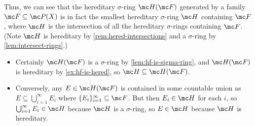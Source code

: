 \documentclass[../notes.tex]{subfiles}
\begin{document}
\begin{remark}
	Thus, we can see that the hereditary $\sigma$-ring $\mc H(\mc F)$ generated by a family $\mc F\subseteq\mc P(X)$ is in fact the smallest hereditary $\sigma$-ring $\mc H$ containing $\mc F$, where $\mc H$ is the intersection of all the hereditary $\sigma$-rings containing $\mc F$. (Note $\mc H$ is hereditary by \autoref{rem:hered-intersections} and a $\sigma$-ring by \autoref{lem:intersect-rings}.)
	\begin{itemize}
		\item Certainly $\mc H(\mc F)$ is a $\sigma$-ring by \autoref{lem:hf-is-sigma-ring}, and $\mc H(\mc F)$ is hereditary by \autoref{ex:hf-is-hered}, so $\mc H\subseteq\mc H(\mc F)$.
		\item Conversely, any $E\in\mc H(\mc F)$ is contained in some countable union as $E\subseteq\bigcup_{i=1}^\infty E_i$ where $\{E_i\}_{i=1}^\infty\subseteq\mc F$. But then $E_i\in\mc H$ for each $i$, so $\bigcup_{i=1}^\infty E_i\in\mc H$ because $\mc H$ is a $\sigma$-ring, so $E\in\mc H$ because $\mc H$ is hereditary.
	\end{itemize}
\end{remark}
\end{document}
